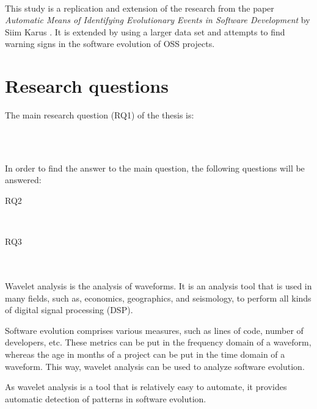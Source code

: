 \paragraph{}
This study is a replication and extension of the research from the paper
\emph{Automatic Means of Identifying Evolutionary Events in Software
Development} by Siim Karus \cite{karus2013}. It is extended by using a larger
data set and attempts to find warning signs in the software evolution of OSS
projects.

\section{Research questions}
\label{questions}

The main research question (RQ1) of the thesis is:
\begin{description}
	\item \hfill \\ \emph{\researchQuestion}
\end{description}

\noindent\\
In order to find the answer to the main question, the following questions will
be answered:
\begin{description}
	\item[RQ2] \hfill \\ \emph{\subQuestionOne}
	\item[RQ3] \hfill \\ \emph{\subQuestionTwo}
\end{description}

\paragraph{}
Wavelet analysis is the analysis of waveforms. It is an analysis tool that is
used in many fields, such as, economics, geographics, and seismology, to
perform all kinds of digital signal processing (DSP).

Software evolution comprises various measures, such as lines of code, number of
developers, etc. These metrics can be put in the frequency domain of a waveform,
whereas the age in months of a project can be put in the time domain of a
waveform. This way, wavelet analysis can be used to analyze software evolution.

As wavelet analysis is a tool that is relatively easy to automate, it
provides automatic detection of patterns in software evolution.

